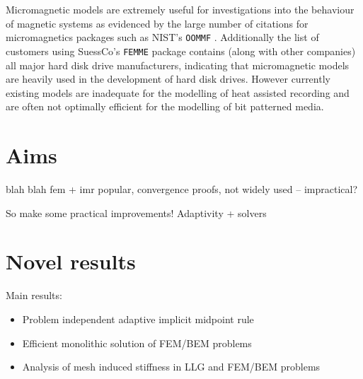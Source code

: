 Micromagnetic models are extremely useful for investigations into the behaviour of magnetic systems as evidenced by the large number of citations for micromagnetics packages such as NIST's \texttt{OOMMF} \cite{oommf-website}. Additionally the list of customers using SuessCo's \texttt{FEMME} package \cite{suessco-website} contains (along with other companies) all major hard disk drive manufacturers, indicating that micromagnetic models are heavily used in the development of hard disk drives. However currently existing models are inadequate for the modelling of heat assisted recording and are often not optimally efficient for the modelling of bit patterned media.



\section{Aims}

blah blah fem + imr popular, convergence proofs, not widely used -- impractical?


So make some practical improvements! Adaptivity + solvers


\section{Novel results}

Main results:
\begin{itemize}
\item Problem independent adaptive implicit midpoint rule
\item Efficient monolithic solution of FEM/BEM problems
\item Analysis of mesh induced stiffness in LLG and FEM/BEM problems
\end{itemize}

